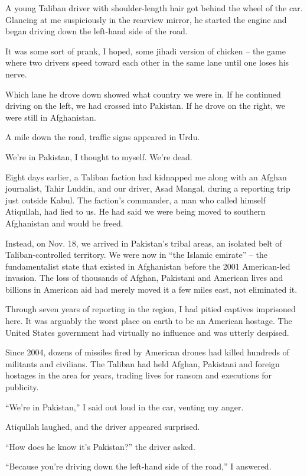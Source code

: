 ﻿\documentclass[12pt]{article}
\begin{document}
\lettrine{A}{} young Taliban driver with shoulder-length hair got behind the
wheel of the car. Glancing at me suspiciously in the rearview mirror, he started the engine and
began driving down the left-hand side of the road.

It was some sort of prank\cite{prank}, I hoped, some jihadi version of chicken -- the game where two
drivers speed toward each other in the same lane until one loses his nerve.

Which lane he drove down showed what country we were in. If he continued driving on the left, we had
crossed into Pakistan. If he drove on the right, we were still in Afghanistan.

A mile down the road, traffic signs appeared in Urdu.

We're in Pakistan, I thought to myself. We're dead.

Eight days earlier, a Taliban faction had kidnapped me along with an Afghan journalist, Tahir
Luddin, and our driver, Asad Mangal, during a reporting trip just outside Kabul. The faction's
commander, a man who called himself Atiqullah, had lied to us. He had said we were being moved to
southern Afghanistan and would be freed.

Instead, on Nov. 18, we arrived in Pakistan's tribal areas, an isolated belt of Taliban-controlled
territory. We were now in ``the Islamic emirate'' -- the fundamentalist state that existed in
Afghanistan before the 2001 American-led invasion. The loss of thousands of Afghan, Pakistani and
American lives and billions in American aid had merely moved it a few miles east, not eliminated it.

Through seven years of reporting in the region, I had pitied captives imprisoned here. It was
arguably the worst place on earth to be an American hostage. The United States government had
virtually no influence and was utterly despised.

Since 2004, dozens of missiles fired by American drones had killed hundreds of militants and
civilians. The Taliban had held Afghan, Pakistani and foreign hostages in the area for years,
trading lives for ransom and executions for publicity.

``We're in Pakistan,'' I said out loud in the car, venting my anger.

Atiqullah laughed, and the driver appeared surprised.

``How does he know it's Pakistan?'' the driver asked.

``Because you're driving down the left-hand side of the road,'' I answered.
\end{document}
